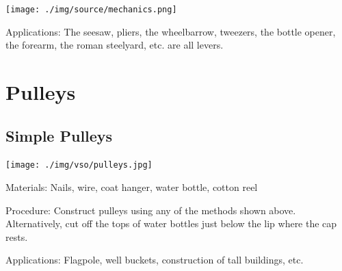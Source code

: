 \begin{multicols}{2}
\begin{center}
\texttt{[image: ./img/source/mechanics.png]}
\end{center}

\begin{description*}
\item[Applications:]{The seesaw, pliers, the wheelbarrow, tweezers, the bottle opener, the forearm, the roman
steelyard, etc. are all levers.}
\end{description*}

\columnbreak


\section*{Pulleys}


\subsection{Simple Pulleys}
\label{sub:pulleys}

\begin{center}
\texttt{[image: ./img/vso/pulleys.jpg]}
\end{center}

\begin{description*}
\item[Materials:]{Nails, wire, coat hanger, water bottle, cotton reel}
\item[Procedure:]{Construct pulleys using any of the methods shown above. Alternatively, cut off the tops of water bottles just below the lip where the cap rests.}
\item[Applications:]{Flagpole, well buckets, construction of tall buildings, etc.}
\end{description*}


\end{multicols}
